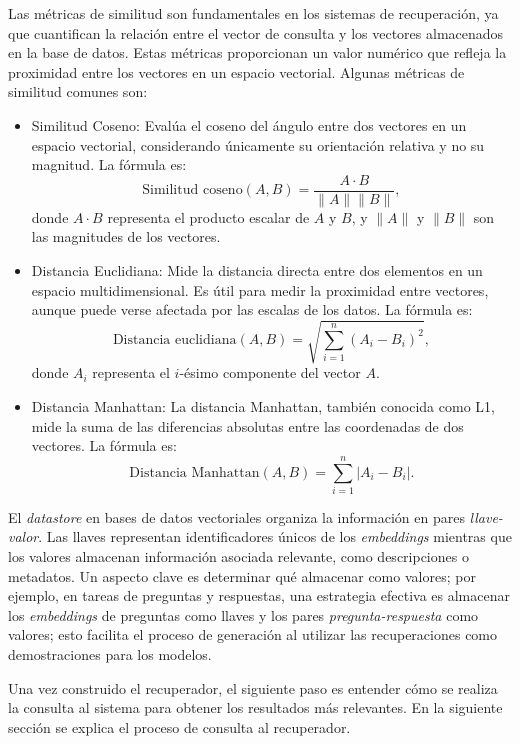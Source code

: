 Las métricas de similitud son fundamentales en los sistemas de recuperación, ya que cuantifican la relación entre el vector de consulta y los vectores almacenados en la base de datos. Estas métricas proporcionan un valor numérico que refleja la proximidad entre los vectores en un espacio vectorial. Algunas métricas de similitud comunes son:

\begin{itemize}
    \item Similitud Coseno: Evalúa el coseno del ángulo entre dos vectores en un espacio vectorial, considerando únicamente su orientación relativa y no su magnitud. La fórmula es:
    \[
    \text{Similitud coseno}(A, B) = \frac{A \cdot B}{\|A\| \|B\|},
    \]
    donde \(A \cdot B\) representa el producto escalar de \(A\) y \(B\), y \(\|A\|\) y \(\|B\|\) son las magnitudes de los vectores.
    
    \item Distancia Euclidiana: Mide la distancia directa entre dos elementos en un espacio multidimensional. Es útil para medir la proximidad entre vectores, aunque puede verse afectada por las escalas de los datos. La fórmula es:
    \[
    \text{Distancia euclidiana}(A, B) = \sqrt{\sum_{i=1}^{n} (A_i - B_i)^2},
    \]
    donde \(A_i\) representa el $i$-ésimo componente del vector \(A\).
    
    \item Distancia Manhattan: La distancia Manhattan, también conocida como L1, mide la suma de las diferencias absolutas entre las coordenadas de dos vectores. La fórmula es:
    \[
    \text{Distancia Manhattan}(A, B) = \sum_{i=1}^{n} |A_i - B_i|.
    \]
\end{itemize}

El \textit{datastore} en bases de datos vectoriales organiza la información en pares \textit{llave-valor}. Las llaves representan identificadores únicos de los \textit{embeddings} mientras que los valores almacenan información asociada relevante, como descripciones o metadatos. Un aspecto clave es determinar qué almacenar como valores; por ejemplo, en tareas de preguntas y respuestas, una estrategia efectiva es almacenar los \textit{embeddings} de preguntas como llaves y los pares \textit{pregunta-respuesta} como valores; esto facilita el proceso de generación al utilizar las recuperaciones como demostraciones para los modelos.

Una vez construido el recuperador, el siguiente paso es entender cómo se realiza la consulta al sistema para obtener los resultados más relevantes. En la siguiente sección se explica el proceso de consulta al recuperador.

